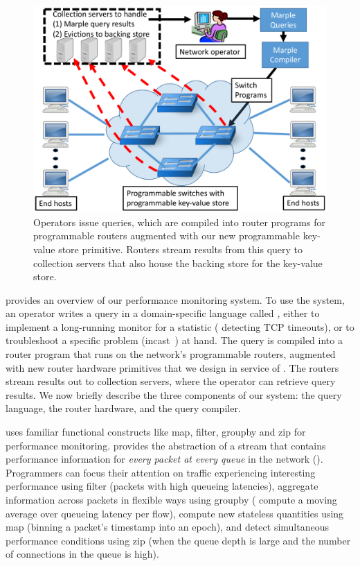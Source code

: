\begin{figure}[!t]
\includegraphics[width=\columnwidth]{pq_overview.pdf}
\caption{Operators issue \TheSystem queries, which are compiled into router
programs for programmable routers augmented with our new programmable
key-value store primitive. Routers stream results from this query to
collection servers that also house the backing store for the key-value store.}
\label{fig:overview}
\end{figure}

 provides an overview of our performance monitoring system. To
use the system, an operator writes a query in a domain-specific language called
{\em \TheSystem,} either to implement a long-running monitor for a statistic (\eg
detecting TCP timeouts), or to troubleshoot a specific problem (\eg incast~\cite{tcpincast}) at hand. The
query is compiled into a router program that runs on the network's programmable
routers, augmented with new router hardware primitives that we design in
service of \TheSystem.  The routers stream results out to collection servers,
where the operator can retrieve query results. We now briefly describe the
three components of our system: the query language, the router hardware, and
the query compiler.

 \TheSystem uses familiar functional
constructs like {\ct map}, {\ct filter}, {\ct groupby} and {\ct zip} for
performance monitoring.
\TheSystem provides the abstraction of a stream that contains performance
information for {\em every packet at every queue} in the network
().
%
Programmers can focus their attention on traffic experiencing interesting
performance using {\ct filter} (\eg packets with high queueing latencies),
aggregate information across packets in flexible ways using {\ct groupby} (\eg
compute a moving average over queueing latency per flow), compute new stateless
quantities using {\ct map} (\eg binning a packet's timestamp into an epoch), and
detect simultaneous performance conditions using {\ct zip} (\eg when the queue
depth is large and the number of connections in the queue is high).

